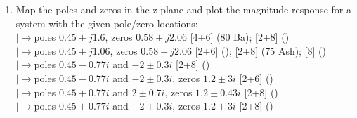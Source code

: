 \documentclass[12pt]{article}
\newcommand{\lb}{\\$\left|\rightarrow\right.$}
\begin{document}
\begin{enumerate}[topsep=0pt, noitemsep]
      \item Map the poles and zeros in the z-plane and plot the magnitude response for a system with the given pole/zero locations:
        \lb poles $0.45\pm j1.6$, zeros $0.58\pm j2.06$ \hfill [4+6] (80 Ba); \hfill [2+8] ()
        \lb poles $0.45\pm j1.06$, zeros $0.58\pm j2.06$ \hfill [2+6] (); [2+8] (75 Ash); [8] ()
        \lb poles $0.45-0.77i$ and $-2\pm0.3i$ \hfill [2+8] ()
        \lb poles $0.45-0.77i$ and $-2\pm0.3i$, zeros $1.2\pm3i$ \hfill [2+6] ()
        \lb poles $0.45+0.77i$ and $2\pm0.7i$, zeros $1.2\pm0.43i$ \hfill [2+8] ()
        \lb poles $0.45+0.77i$ and $-2\pm0.3i$, zeros $1.2\pm3i$ \hfill [2+8] ()
    \end{enumerate}
\end{document}
